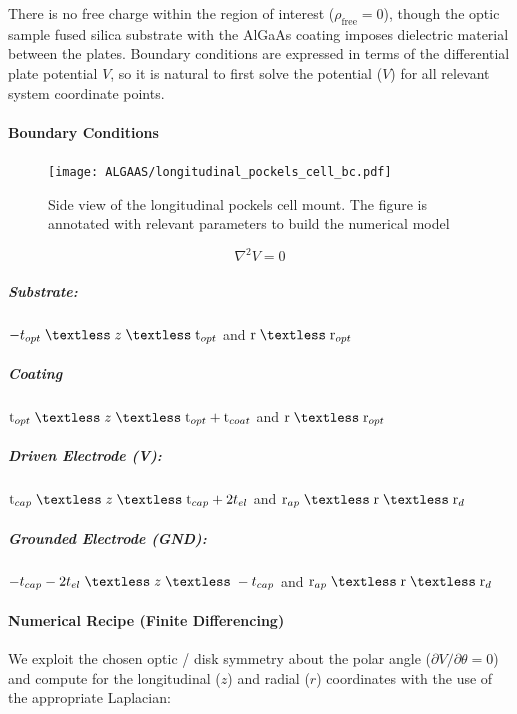 \noindent There is no free charge within the region of interest ($\rho_\mathrm{free}=0$), though the optic sample fused silica substrate with the AlGaAs coating imposes dielectric material between the plates. Boundary conditions are expressed in terms of the differential plate potential $V$, so it is natural to first solve the potential ($V$) for all relevant system coordinate points.  


\paragraph*{Boundary Conditions}

\begin{figure}[H]
  \centering
  \texttt{[image: ALGAAS/longitudinal\_pockels\_cell\_bc.pdf]}
  \caption{Side view of the longitudinal pockels cell mount. The figure is annotated with relevant parameters to build the numerical model}
  \label{fig:laplacecoords}
\end{figure}

\begin{equation}\label{eq:cyllap}
\nabla^2 V = 0
\end{equation}

\subparagraph*{Substrate:}
$ -t_{opt} \; \textless \; z \; \textless \;\mathrm{t}_{opt} $ and $\mathrm{r} \; \textless \;\mathrm{r}_{opt}$
\subparagraph*{Coating}
$\mathrm{t}_{opt} \; \textless \; z \; \textless \;\mathrm{t}_{opt} +\mathrm{t}_{coat} $ and $\mathrm{r} \; \textless \;\mathrm{r}_{opt} $

\subparagraph*{Driven Electrode (V):}
$\mathrm{t}_{cap} \; \textless \; z \; \textless \;\mathrm{t}_{cap} + 2t_{el} $ and $\mathrm{r}_{ap} \; \textless \;\mathrm{r} \; \textless \;\mathrm{r}_{d} $

\subparagraph*{Grounded Electrode (GND):}
$ -t_{cap} -2t_{el} \; \textless \; z \; \textless \; -t_{cap} $ and $\mathrm{r}_{ap} \; \textless \;\mathrm{r} \; \textless \;\mathrm{r}_{d} $

\paragraph*{Numerical Recipe (Finite Differencing)}

We exploit the chosen optic / disk symmetry about the polar angle ($\partial V / \partial \theta = 0$) and compute for the longitudinal ($z$) and radial ($r$) coordinates with the use of the appropriate Laplacian:

